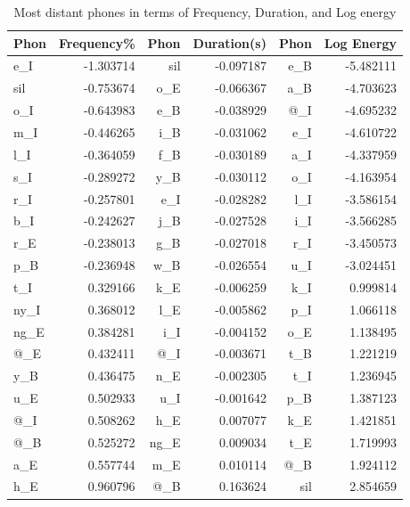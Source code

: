 \documentclass[conference]{IEEEtran}
\begin{document}
\begin{table}[!htb]
\renewcommand{\arraystretch}{1.3}
\caption{Most distant phones in terms of Frequency, Duration, and Log energy}
\label{freq_dur_diff}
\centering
\begin{tabular}{|l|r|r|r|r|r|}
    \hline
    Phon & Frequency\% & Phon & Duration(s) & Phon & Log Energy\\
    \hline
    e\_I  & -1.303714 & sil  & -0.097187  & e\_B & -5.482111 \\
    sil  & -0.753674  & o\_E  & -0.066367 & a\_B & -4.703623 \\
    o\_I  & -0.643983 & e\_B  & -0.038929 & @\_I & -4.695232 \\
    m\_I  & -0.446265 & i\_B  & -0.031062 & e\_I & -4.610722 \\
    l\_I  & -0.364059 & f\_B  & -0.030189 & a\_I & -4.337959 \\
    s\_I  & -0.289272 & y\_B  & -0.030112 & o\_I & -4.163954 \\
    r\_I  & -0.257801 & e\_I  & -0.028282 & l\_I & -3.586154 \\
    b\_I  & -0.242627 & j\_B  & -0.027528 & i\_I & -3.566285 \\
    r\_E  & -0.238013 & g\_B  & -0.027018 & r\_I & -3.450573 \\
    p\_B  & -0.236948 & w\_B  & -0.026554 & u\_I & -3.024451 \\
    \hline
    t\_I  &  0.329166 & k\_E  & -0.006259 & k\_I &  0.999814 \\
    ny\_I &  0.368012 & l\_E  & -0.005862 & p\_I &  1.066118 \\
    ng\_E &  0.384281 & i\_I  & -0.004152 & o\_E &  1.138495 \\
    @\_E  &  0.432411 & @\_I  & -0.003671 & t\_B &  1.221219 \\
    y\_B  &  0.436475 & n\_E  & -0.002305 & t\_I &  1.236945 \\
    u\_E  &  0.502933 & u\_I  & -0.001642 & p\_B &  1.387123 \\
    @\_I  &  0.508262 & h\_E  &  0.007077 & k\_E &  1.421851 \\
    @\_B  &  0.525272 & ng\_E &  0.009034 & t\_E &  1.719993 \\
    a\_E  &  0.557744 & m\_E  &  0.010114 & @\_B &  1.924112 \\
    h\_E  &  0.960796 & @\_B  &  0.163624 & sil &  2.854659 \\
    \hline
\end{tabular}
\end{table}
\end{document}

